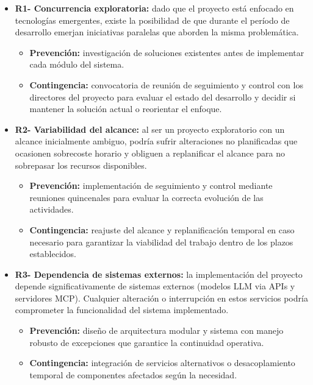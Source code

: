 \begin{itemize}
  \item\textbf{R1- Concurrencia exploratoria: }dado que el proyecto está enfocado en tecnologías emergentes, existe la posibilidad de que durante el período de desarrollo emerjan iniciativas paralelas que aborden la misma problemática.
  \begin{itemize}
    \item \textbf{Prevención: }investigación de soluciones existentes antes de implementar cada módulo del sistema.
    \item \textbf{Contingencia: }convocatoria de reunión de seguimiento y control con los directores del proyecto para evaluar el estado del desarrollo y decidir si mantener la solución actual o reorientar el enfoque.
  \end{itemize}
  
  \item\textbf{R2- Variabilidad del alcance: }al ser un proyecto exploratorio con un alcance inicialmente ambiguo, podría sufrir alteraciones no planificadas que ocasionen sobrecoste horario y obliguen a replanificar el alcance para no sobrepasar los recursos disponibles.
  \begin{itemize}
    \item \textbf{Prevención: }implementación de seguimiento y control mediante reuniones quincenales para evaluar la correcta evolución de las actividades.
    \item \textbf{Contingencia: }reajuste del alcance y replanificación temporal en caso necesario para garantizar la viabilidad del trabajo dentro de los plazos establecidos.
  \end{itemize}
  
  \item\textbf{R3- Dependencia de sistemas externos: }la implementación del proyecto depende significativamente de sistemas externos (modelos LLM via APIs y servidores MCP). Cualquier alteración o interrupción en estos servicios podría comprometer la funcionalidad del sistema implementado.
  \begin{itemize}
    \item \textbf{Prevención: }diseño de arquitectura modular y sistema con manejo robusto de excepciones que garantice la continuidad operativa.
  \item \textbf{Contingencia: }integración de servicios alternativos o desacoplamiento temporal de componentes afectados según la necesidad.
  \end{itemize}
  

\end{itemize}
